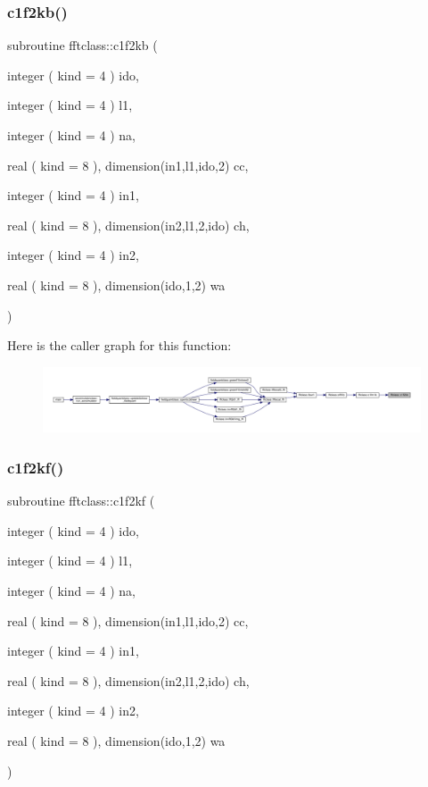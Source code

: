 \subsubsection{\texorpdfstring{c1f2kb()}{c1f2kb()}}
{\footnotesize\ttfamily subroutine fftclass\+::c1f2kb (\begin{DoxyParamCaption}\item[{integer ( kind = 4 )}]{ido,  }\item[{integer ( kind = 4 )}]{l1,  }\item[{integer ( kind = 4 )}]{na,  }\item[{real ( kind = 8 ), dimension(in1,l1,ido,2)}]{cc,  }\item[{integer ( kind = 4 )}]{in1,  }\item[{real ( kind = 8 ), dimension(in2,l1,2,ido)}]{ch,  }\item[{integer ( kind = 4 )}]{in2,  }\item[{real ( kind = 8 ), dimension(ido,1,2)}]{wa }\end{DoxyParamCaption})}

Here is the caller graph for this function\+:\nopagebreak
\begin{figure}[H]
\begin{center}
\leavevmode
\includegraphics[width=350pt]{namespacefftclass_a5b4381756639205cdda3aa66b4d3e98c_icgraph}
\end{center}
\end{figure}
\mbox{\label{namespacefftclass_a0535bb9fc14fda824be9053638cdfb2a}} 
\subsubsection{\texorpdfstring{c1f2kf()}{c1f2kf()}}
{\footnotesize\ttfamily subroutine fftclass\+::c1f2kf (\begin{DoxyParamCaption}\item[{integer ( kind = 4 )}]{ido,  }\item[{integer ( kind = 4 )}]{l1,  }\item[{integer ( kind = 4 )}]{na,  }\item[{real ( kind = 8 ), dimension(in1,l1,ido,2)}]{cc,  }\item[{integer ( kind = 4 )}]{in1,  }\item[{real ( kind = 8 ), dimension(in2,l1,2,ido)}]{ch,  }\item[{integer ( kind = 4 )}]{in2,  }\item[{real ( kind = 8 ), dimension(ido,1,2)}]{wa }\end{DoxyParamCaption})}

